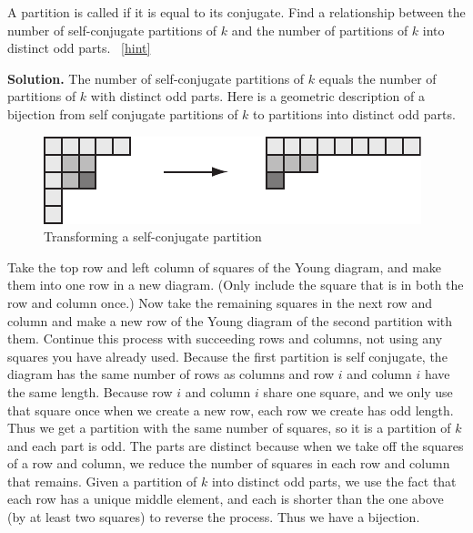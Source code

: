 \documentclass{book}
\begin{document}
\setcounter{project}{305}
\addtocounter{project}{-1}
\begin{activity}[]\label{activity-298}
\hypertarget{p-1579}{}%
A partition is called  if it is equal to its conjugate. Find a relationship between the number of self-conjugate partitions of \(k\) and the number of partitions of \(k\) into distinct odd parts.%
~\hfill{\tiny\hyperlink{a-305}{[hint]}\hypertarget{q-305}{}}\par\smallskip%
\noindent\textbf{Solution.}\hypertarget{solution-233}{}\quad%
\hypertarget{p-1581}{}%
The number of self-conjugate partitions of \(k\) equals the number of partitions of \(k\) with distinct odd parts. Here is a geometric description of a bijection from self conjugate partitions of \(k\) to partitions into distinct odd parts.%
\begin{figure}
\centering
\includegraphics[width=0.6\linewidth]{images/selfconjugate}
\caption{Transforming a self-conjugate partition\label{selfconjugate-to-distinctodd}}
\end{figure}
\hypertarget{p-1582}{}%
Take the top row and left column of squares of the Young diagram, and make them into one row in a new diagram. (Only include the square that is in both the row and column once.) Now take the remaining squares in the next row and column and make a new row of the Young diagram of the second partition with them. Continue this process with succeeding rows and columns, not using any squares you have already used. Because the first partition is self conjugate, the diagram has the same number of rows as columns and row \(i\) and column \(i\) have the same length. Because row \(i\) and column \(i\) share one square, and we only use that square once when we create a new row, each row we create has odd length. Thus we get a partition with the same number of squares, so it is a partition of \(k\) and each part is odd. The parts are distinct because when we take off the squares of a row and column, we reduce the number of squares in each row and column that remains. Given a partition of \(k\) into distinct odd parts, we use the fact that each row has a unique middle element, and each is shorter than the one above (by at least two squares) to reverse the process. Thus we have a bijection.%
\end{activity}
\end{document}
